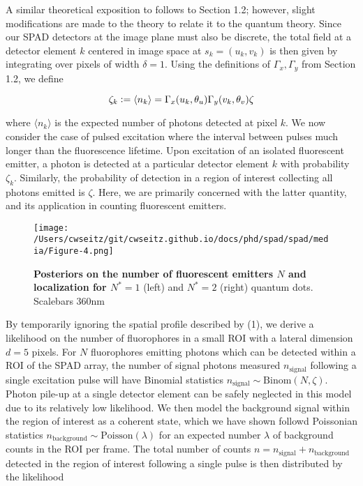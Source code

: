 A similar theoretical exposition to follows to Section 1.2; however, slight modifications are made to the theory to relate it to the quantum theory. Since our SPAD detectors at the image plane must also be discrete, the total field at a detector element $k$ centered in image space at $s_k=(u_k,v_k)$ is then given by integrating over pixels of width $\delta=1$. Using the definitions of $\Gamma_x,\Gamma_y$ from Section 1.2, we define

\begin{equation}
\zeta_{k}\vcentcolon = \langle n_{k} \rangle = \Gamma_{x}(u_k,\theta_u)\Gamma_{y}(v_k,\theta_v)\zeta
\end{equation}

where $\langle n_{k} \rangle$ is the expected number of photons detected at pixel $k$. We now consider the case of pulsed excitation where the interval between pulses much longer than the fluorescence lifetime. Upon excitation of an isolated fluorescent emitter, a photon is detected at a particular detector element $k$ with probability $\zeta_{k}$. Similarly, the probability of detection in a region of interest collecting all photons emitted is $\zeta$. Here, we are primarily concerned with the latter quantity, and its application in counting fluorescent emitters.

\begin{figure}[t]
\centering
\texttt{[image: /Users/cwseitz/git/cwseitz.github.io/docs/phd/spad/spad/media/Figure-4.png]}
\caption{\textbf{Posteriors on the number of fluorescent emitters $N$ and localization for $N^{*}=1$} (left) and $N^{*}=2$ (right) quantum dots. Scalebars 360nm}
\label{fig:fig7}
\end{figure}   

By temporarily ignoring the spatial profile described by (1), we derive a likelihood on the number of fluorophores in a small ROI with a lateral dimension $d = 5$ pixels. For $N$ fluorophores emitting photons which can be detected within a ROI of the SPAD array, the number of signal photons measured $n_{\mathrm{signal}}$ following a single excitation pulse will have Binomial statistics $n_{\mathrm{signal}} \sim \mathrm{Binom}(N,\zeta)$. Photon pile-up at a single detector element can be safely neglected in this model due to its relatively low likelihood. We then model the background signal within the region of interest as a coherent state, which we have shown followd Poissonian statistics $n_{\mathrm{background}} \sim \mathrm{Poisson}(\lambda)$ for an expected number $\lambda$ of background counts in the ROI per frame. The total number of counts $n=n_{\mathrm{signal}}+n_{\mathrm{background}}$ detected in the region of interest following a single pulse is then distributed by the likelihood

